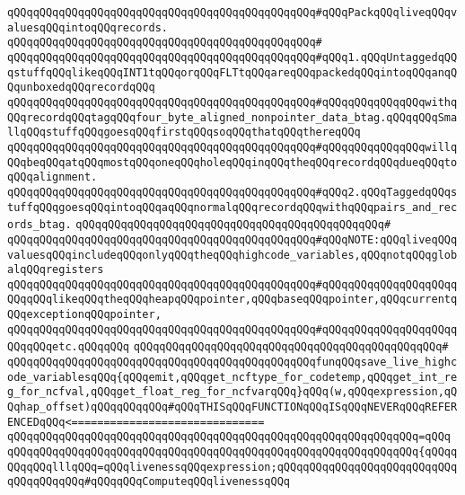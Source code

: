 \newline
\newline
\verb|qQQqqQQqqQQqqQQqqQQqqQQqqQQqqQQqqQQqqQQqqQQqqQQq#qQQqPackqQQqliveqQQqvaluesqQQqintoqQQqrecords.|\newline
\verb|qQQqqQQqqQQqqQQqqQQqqQQqqQQqqQQqqQQqqQQqqQQqqQQq#|\newline
\verb|qQQqqQQqqQQqqQQqqQQqqQQqqQQqqQQqqQQqqQQqqQQqqQQq#qQQq1.qQQqUntaggedqQQqstuffqQQqlikeqQQqINT1tqQQqorqQQqFLTtqQQqareqQQqpackedqQQqintoqQQqanqQQqunboxedqQQqrecordqQQq|\newline
\verb|qQQqqQQqqQQqqQQqqQQqqQQqqQQqqQQqqQQqqQQqqQQqqQQq#qQQqqQQqqQQqqQQqwithqQQqrecordqQQqtagqQQqfour_byte_aligned_nonpointer_data_btag.qQQqqQQqSmallqQQqstuffqQQqgoesqQQqfirstqQQqsoqQQqthatqQQqthereqQQq|\newline
\verb|qQQqqQQqqQQqqQQqqQQqqQQqqQQqqQQqqQQqqQQqqQQqqQQq#qQQqqQQqqQQqqQQqwillqQQqbeqQQqatqQQqmostqQQqoneqQQqholeqQQqinqQQqtheqQQqrecordqQQqdueqQQqtoqQQqalignment.|\newline
\verb|qQQqqQQqqQQqqQQqqQQqqQQqqQQqqQQqqQQqqQQqqQQqqQQq#qQQq2.qQQqTaggedqQQqstuffqQQqgoesqQQqintoqQQqaqQQqnormalqQQqrecordqQQqwithqQQqpairs_and_records_btag.|\newline
\verb|qQQqqQQqqQQqqQQqqQQqqQQqqQQqqQQqqQQqqQQqqQQqqQQq#|\newline
\verb|qQQqqQQqqQQqqQQqqQQqqQQqqQQqqQQqqQQqqQQqqQQqqQQq#qQQqNOTE:qQQqliveqQQqvaluesqQQqincludeqQQqonlyqQQqtheqQQqhighcode_variables,qQQqnotqQQqglobalqQQqregisters|\newline
\verb|qQQqqQQqqQQqqQQqqQQqqQQqqQQqqQQqqQQqqQQqqQQqqQQq#qQQqqQQqqQQqqQQqqQQqqQQqqQQqlikeqQQqtheqQQqheapqQQqpointer,qQQqbaseqQQqpointer,qQQqcurrentqQQqexceptionqQQqpointer,|\newline
\verb|qQQqqQQqqQQqqQQqqQQqqQQqqQQqqQQqqQQqqQQqqQQqqQQq#qQQqqQQqqQQqqQQqqQQqqQQqqQQqetc.qQQqqQQq|\newline
\verb|qQQqqQQqqQQqqQQqqQQqqQQqqQQqqQQqqQQqqQQqqQQqqQQq#|\newline
\verb|qQQqqQQqqQQqqQQqqQQqqQQqqQQqqQQqqQQqqQQqqQQqqQQqfunqQQqsave_live_highcode_variablesqQQq{qQQqemit,qQQqget_ncftype_for_codetemp,qQQqget_int_reg_for_ncfval,qQQqget_float_reg_for_ncfvarqQQq}qQQq(w,qQQqexpression,qQQqhap_offset)qQQqqQQqqQQq#qQQqTHISqQQqFUNCTIONqQQqISqQQqNEVERqQQqREFERENCEDqQQq<==============================|\newline
\verb|qQQqqQQqqQQqqQQqqQQqqQQqqQQqqQQqqQQqqQQqqQQqqQQqqQQqqQQqqQQqqQQq=qQQq|\newline
\verb|qQQqqQQqqQQqqQQqqQQqqQQqqQQqqQQqqQQqqQQqqQQqqQQqqQQqqQQqqQQqqQQq{qQQqqQQqqQQqlllqQQq=qQQqlivenessqQQqexpression;qQQqqQQqqQQqqQQqqQQqqQQqqQQqqQQqqQQqqQQq#qQQqqQQqComputeqQQqlivenessqQQq|\newline

